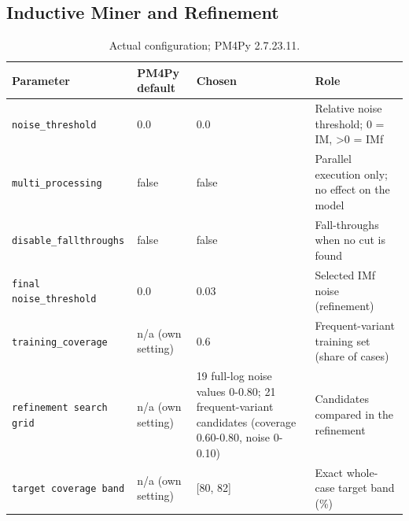 \subsection{Inductive Miner and Refinement}
\begin{table}[h!]
\centering
\small
\begin{tabular}{p{}p{}p{}p{}}
\hline
Parameter & PM4Py default & Chosen & Role \\
\hline
\texttt{noise\_\allowbreak{}threshold} & 0.0 & 0.0 & Relative noise threshold; 0 = IM, >0 = IMf \\
\texttt{multi\_\allowbreak{}processing} & false & false & Parallel execution only; no effect on the model \\
\texttt{disable\_\allowbreak{}fallthroughs} & false & false & Fall-throughs when no cut is found \\
\texttt{final noise\_\allowbreak{}threshold} & 0.0 & 0.03 & Selected IMf noise (refinement) \\
\texttt{training\_\allowbreak{}coverage} & n/a (own setting) & 0.6 & Frequent-variant training set (share of cases) \\
\texttt{refinement search grid} & n/a (own setting) & 19 full-log noise values 0-0.80; 21 frequent-variant candidates (coverage 0.60-0.80, noise 0-0.10) & Candidates compared in the refinement \\
\texttt{target coverage band} & n/a (own setting) & [80, 82] & Exact whole-case target band (\%) \\
\hline
\end{tabular}
\caption{Actual configuration; PM4Py 2.7.23.11.}
\end{table}
\clearpage
